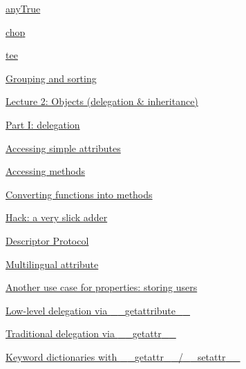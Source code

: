 \documentclass[10pt,a4paper,english]{article}
\begin{document}
\begin{list}{}{}
\begin{list}{}{}
\begin{list}{}{}
\item {} \href{\#anytrue}{anyTrue}

\item {} \href{\#chop}{chop}

\item {} \href{\#tee}{tee}

\item {} \href{\#grouping-and-sorting}{Grouping and sorting}

\end{list}

\end{list}

\item {} \href{\#lecture-2-objects-delegation-inheritance}{Lecture 2: Objects (delegation {\&} inheritance)}
\begin{list}{}{}
\item {} \href{\#part-i-delegation}{Part I: delegation}
\begin{list}{}{}
\item {} \href{\#accessing-simple-attributes}{Accessing simple attributes}

\item {} \href{\#accessing-methods}{Accessing methods}

\item {} \href{\#converting-functions-into-methods}{Converting functions into methods}

\item {} \href{\#hack-a-very-slick-adder}{Hack: a very slick adder}

\item {} \href{\#descriptor-protocol}{Descriptor Protocol}

\item {} \href{\#multilingual-attribute}{Multilingual attribute}

\item {} \href{\#another-use-case-for-properties-storing-users}{Another use case for properties: storing users}

\item {} \href{\#low-level-delegation-via-getattribute}{Low-level delegation via {\_}{\_}getattribute{\_}{\_}}

\item {} \href{\#traditional-delegation-via-getattr}{Traditional delegation via {\_}{\_}getattr{\_}{\_}}

\item {} \href{\#keyword-dictionaries-with-getattr-setattr}{Keyword dictionaries with {\_}{\_}getattr{\_}{\_}/{\_}{\_}setattr{\_}{\_}}


\end{list}
\end{list}
\end{list}
\end{document}
